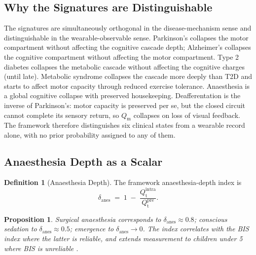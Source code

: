 \documentclass[11pt,twocolumn,a4paper]{article}
\newtheorem{proposition}[theorem]{Proposition}
\theoremstyle{definition}
\newtheorem{definition}[theorem]{Definition}
\theoremstyle{remark}
\newcommand{\Qm}{Q_{\mathrm{m}}}
\newcommand{\Qt}{Q_{\mathrm{t}}}
\begin{document}
\subsection{Why the Signatures are Distinguishable}

The signatures are simultaneously orthogonal in the disease-mechanism
sense and distinguishable in the wearable-observable sense.
Parkinson's collapses the motor compartment without affecting the
cognitive cascade depth; Alzheimer's collapses the cognitive
compartment without affecting the motor compartment. Type 2 diabetes
collapses the metabolic cascade without affecting the cognitive
charges (until late). Metabolic syndrome collapses the cascade more
deeply than T2D and starts to affect motor capacity through reduced
exercise tolerance. Anaesthesia is a global cognitive collapse with
preserved housekeeping. Deafferentation is the inverse of
Parkinson's: motor capacity is preserved per se, but the closed
circuit cannot complete its sensory return, so $\Qm$ collapses on
loss of visual feedback. The framework therefore distinguishes
six clinical states from a wearable record alone, with no
prior probability assigned to any of them.

\subsection{Anaesthesia Depth as a Scalar}

\begin{definition}[Anaesthesia Depth]
\label{def:delta-anes}
The framework anaesthesia-depth index is
\begin{equation}
\delta_{\mathrm{anes}} \;=\; 1 \;-\; \frac{\Qt^{\mathrm{intra}}}{\Qt^{\mathrm{pre}}}.
\end{equation}
\end{definition}

\begin{proposition}
Surgical anaesthesia corresponds to $\delta_{\mathrm{anes}} \approx
0.8$; conscious sedation to $\delta_{\mathrm{anes}} \approx 0.5$;
emergence to $\delta_{\mathrm{anes}} \to 0$. The index correlates
with the BIS index \citep{kelley2003} where the latter is reliable,
and extends measurement to children under 5 where BIS is
unreliable \citep{davidson2005}.
\end{proposition}
\end{document}
